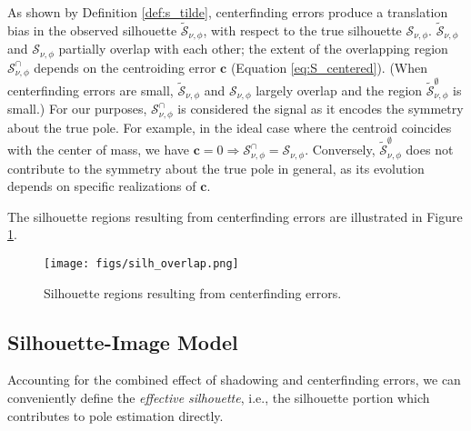 As shown by Definition \ref{def:s_tilde}, centerfinding errors produce a translation bias in the observed silhouette $\widetilde{\mathcal{S}}_{\nu,\phi}$, with respect to the true silhouette $\mathcal{S}_{\nu,\phi}$. $\widetilde{\mathcal{S}}_{\nu,\phi}$ and $\mathcal{S}_{\nu,\phi}$ partially overlap with each other; the extent of the overlapping region $\mathcal{S}^\cap_{\nu,\phi}$ depends on the centroiding error $\mathbf{c}$ (Equation \ref{eq:S_centered}). (When centerfinding errors are small, $\widetilde{\mathcal{S}}_{\nu,\phi}$ and $\mathcal{S}_{\nu,\phi}$ largely overlap and the region $\tilde{\mathcal{S}}^\emptyset_{\nu,\phi}$ is small.) For our purposes, $\mathcal{S}^\cap_{\nu,\phi}$ is considered the signal as it encodes the symmetry about the true pole. For example, in the ideal case where the centroid coincides with the center of mass, we have $\mathbf{c}=0 \Rightarrow \mathcal{S}^\cap_{\nu,\phi} = \mathcal{S}_{\nu,\phi}$. Conversely, $\tilde{\mathcal{S}}^\emptyset_{\nu,\phi}$ does not contribute to the symmetry about the true pole in general, as its evolution depends on specific realizations of $\mathbf{c}$.

The silhouette regions resulting from centerfinding errors are illustrated in Figure \ref{fig:silh_overlap}.

\begin{figure}
    \centering
    \texttt{[image: figs/silh\_overlap.png]}
    \caption{Silhouette regions resulting from centerfinding errors.}
    \label{fig:silh_overlap}
\end{figure}

\subsection{Silhouette-Image Model}
\label{sec:imaging_msr_model}

Accounting for the combined effect of shadowing and centerfinding errors, we can conveniently define the \textit{effective silhouette}, i.e., the silhouette portion which contributes to pole estimation directly.

